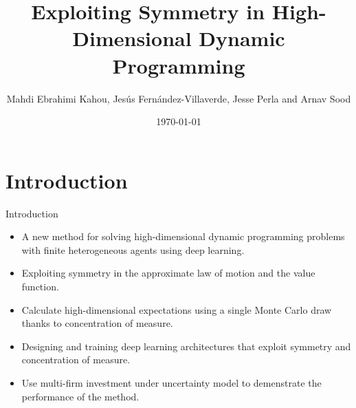 \documentclass[dvipsnames,mathserif]{beamer}
\begin{document}
\rightskip\rightmargin
\title{Exploiting Symmetry in High-Dimensional Dynamic Programming}
\author{Mahdi Ebrahimi Kahou, Jesús Fernández-Villaverde, Jesse Perla and Arnav Sood}

\footnotesize{\date{\today }


\begin{frame}
\maketitle
\end{frame}


%
\footnotesize \tableofcontents
%
\section{Introduction}
\begin{frame}{Introduction}
    \begin{itemize}
        \item A new method for solving high-dimensional dynamic programming problems with finite heterogeneous agents using deep learning.\\
        \vspace{0.2cm}
        \item Exploiting symmetry in the approximate law of motion and the value function.
        \vspace{0.2cm}
        \item Calculate high-dimensional expectations using a single Monte Carlo draw thanks to concentration of measure.
        \vspace{0.2cm}
        \item Designing and training deep learning architectures that exploit symmetry and concentration of measure.
        \item Use multi-firm investment under uncertainty model to demenstrate the performance of the method. 
    \end{itemize}
\end{frame}


}
\end{document}
